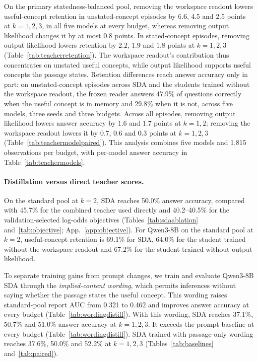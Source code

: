 On the primary statedness-balanced pool, removing the workspace readout
lowers useful-concept retention in unstated-concept episodes by $6.6$,
$4.5$ and $2.5$ points at $k=1,2,3$, in all five models at every
budget, whereas removing output likelihood changes it by at most
$0.8$ points. In stated-concept episodes, removing output likelihood
lowers retention by $2.2$, $1.9$ and $1.8$ points at $k=1,2,3$
(Table~\ref{tab:teacherretention}). The workspace readout's contribution
thus concentrates on unstated useful concepts, while output likelihood
supports useful concepts the passage states. Retention differences
reach answer accuracy only in part: on unstated-concept episodes across
SDA and the students trained without the workspace readout, the frozen
reader answers 47.9\% of questions correctly when the useful concept
is in memory and 29.8\% when it is not, across five models, three seeds
and three budgets. Across all episodes, removing output likelihood
lowers answer accuracy by $1.6$ and $1.7$ points at $k=1,2$; removing
the workspace readout lowers it by $0.7$, $0.6$ and $0.3$ points at
$k=1,2,3$ (Table~\ref{tab:teachermodelpaired}). This analysis combines
five models and 1,815 observations per budget, with per-model answer
accuracy in Table~\ref{tab:teachermodels}.

\paragraph{Distillation versus direct teacher scores.}
On the standard pool at $k=2$, SDA reaches 50.0\% answer accuracy,
compared with 45.7\% for the combined teacher used directly and
40.2--40.5\% for the validation-selected log-odds objectives
(Tables~\ref{tab:sdaablation} and~\ref{tab:objective};
App.~\ref{app:objective}).
For Qwen3-8B on the standard pool at $k=2$, useful-concept retention
is 69.1\% for SDA, 64.0\% for the student trained without the workspace
readout and 67.2\% for the student trained without output likelihood.

To separate training gains from prompt changes, we train and evaluate
Qwen3-8B SDA through the \emph{implied-content wording}, which permits
inferences without saying whether the passage states the useful
concept. This wording raises standard-pool report AUC from 0.321 to
0.462 and improves answer accuracy at every budget
(Table~\ref{tab:wordingdistill}). With this wording, SDA reaches
37.1\%, 50.7\% and 51.0\% answer accuracy at $k=1,2,3$. It exceeds
the prompt baseline at every budget (Table~\ref{tab:wordingdistill}).
SDA trained with passage-only wording reaches 37.6\%, 50.0\% and
52.2\% at $k=1,2,3$
(Tables~\ref{tab:baselines} and~\ref{tab:paired}).

